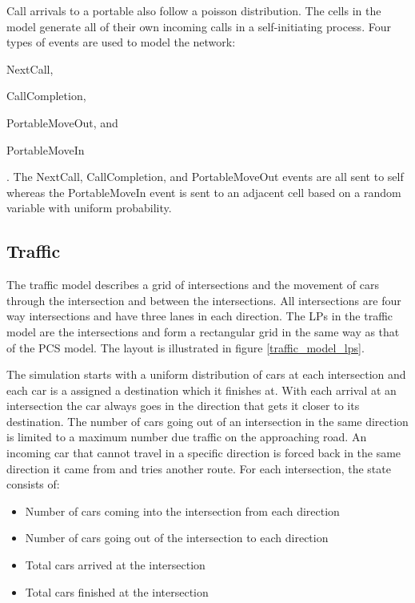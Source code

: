 \documentclass[11pt]{book}
\begin{document}
\noindent
Call arrivals to a portable also follow a poisson distribution. The cells in the model
generate all of their own incoming calls in a self-initiating process.
Four types of events are used to model the network: \begin{inparaenum}[(1)] \item NextCall,
\item CallCompletion, \item PortableMoveOut, and \item PortableMoveIn \end{inparaenum}.
The NextCall, CallCompletion, and PortableMoveOut events are all sent to self whereas
the PortableMoveIn event is sent to an adjacent cell based on a random variable with
uniform probability.

\subsection{Traffic}

The traffic model describes a grid of intersections and the movement of cars through
the intersection and between the intersections. All intersections are four way intersections
and have three lanes in each direction. The LPs in the traffic model are the intersections
and form a rectangular grid in the same way as that of the PCS model. The layout is illustrated
in figure \ref{traffic_model_lps}.

The simulation starts with a uniform distribution of cars at each intersection and each
car is a assigned a destination which it finishes at. With each arrival at an intersection
the car always goes in the direction that gets it closer to its destination.
The number of cars going out of an intersection in the same direction is limited to a
maximum number due traffic on the approaching road. An incoming car that cannot travel in
a specific direction is forced back in the same direction it came from and tries another
route. For each intersection, the state consists of:

\begin{itemize}
    \item Number of cars coming into the intersection from each direction
    \item Number of cars going out of the intersection to each direction
    \item Total cars arrived at the intersection
    \item Total cars finished at the intersection
\end{itemize}
\end{document}
